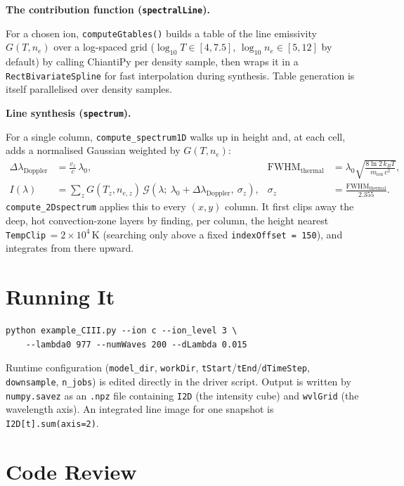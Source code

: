 \documentclass[11pt]{article}
\newcommand{\code}[1]{\texttt{#1}}
\newcommand{\hh}[1]{\vspace{2pt}\noindent\textbf{#1}\par\vspace{1pt}}
\begin{document}
\hh{The contribution function (\code{spectralLine}).}
For a chosen ion, \code{computeGtables()} builds a table of the line emissivity
$G(T,n_e)$ over a log-spaced grid ($\log_{10}T \in [4, 7.5]$,
$\log_{10}n_e \in [5, 12]$ by default) by calling ChiantiPy per density sample,
then wraps it in a \code{RectBivariateSpline} for fast interpolation during
synthesis. Table generation is itself parallelised over density samples.

\hh{Line synthesis (\code{spectrum}).}
For a single column, \code{compute\_spectrum1D} walks up in height and, at each
cell, adds a normalised Gaussian weighted by $G(T,n_e)$:
\begin{align}
\Delta\lambda_{\text{Doppler}} &= \frac{v_z}{c}\,\lambda_0,
&
\text{FWHM}_{\text{thermal}} &= \lambda_0\sqrt{\frac{8\ln 2\,k_B T}{m_{\text{ion}}\,c^2}},
\\[2pt]
I(\lambda) &= \sum_{z}
   G\!\left(T_z, n_{e,z}\right)\,
   \mathcal{G}\!\left(\lambda;\ \lambda_0+\Delta\lambda_{\text{Doppler}},\ \sigma_z\right),
& \sigma_z &= \frac{\text{FWHM}_{\text{thermal}}}{2.355}.
\end{align}
\code{compute\_2Dspectrum} applies this to every $(x,y)$ column. It first clips
away the deep, hot convection-zone layers by finding, per column, the height
nearest \code{TempClip}\,$=2\times10^4$\,K (searching only above a fixed
\code{indexOffset = 150}), and integrates from there upward.

\section{Running It}

\begin{lstlisting}
python example_CIII.py --ion c --ion_level 3 \
    --lambda0 977 --numWaves 200 --dLambda 0.015
\end{lstlisting}

\noindent Runtime configuration (\code{model\_dir}, \code{workDir},
\code{tStart}/\code{tEnd}/\code{dTimeStep}, \code{downsample},
\code{n\_jobs}) is edited directly in the driver script. Output is written by
\code{numpy.savez} as an \code{.npz} file containing \code{I2D} (the intensity
cube) and \code{wvlGrid} (the wavelength axis). An integrated line image for one
snapshot is \code{I2D[t].sum(axis=2)}.

\section{Code Review}
\end{document}
